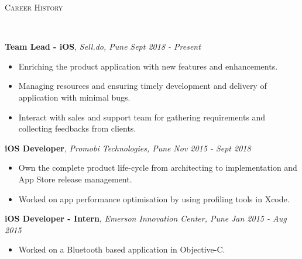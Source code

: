\documentclass[9pt]{article}
\newenvironment{changemargin}[2]{%
  \begin{list}{}{%
    \setlength{\topsep}{0pt}%
    \setlength{\leftmargin}{#1}%
    \setlength{\rightmargin}{#2}%
    \setlength{\listparindent}{\parindent}%
    \setlength{\itemindent}{\parindent}%
    \setlength{\parsep}{\parskip}%
  }%
  \item[]}{\end{list}
}
\newcommand{\lineover}{
    \begin{changemargin}{-0.05in}{-0.05in}
        \vspace*{-8pt}
        \hrulefill \\
        \vspace*{-2pt}
    \end{changemargin}
}
\newcommand{\header}[1]{
    \begin{changemargin}{-0.5in}{-0.5in}
        \scshape{#1}\\
    \lineover
    \end{changemargin}
}
\newenvironment{body} {
    \vspace*{-16pt}
    \begin{changemargin}{-0.25in}{-0.5in}
  }
    {\end{changemargin}
}
\begin{document}
\header{Career History}

\begin{body}
    \vspace{14pt}
    \textbf{Team Lead - iOS}, \emph{Sell.do, Pune} \hfill \emph{Sept 2018 - Present}\\
    \begin{itemize} \itemsep -0pt  %
        \item Enriching the product application with new features and enhancements.
    \end{itemize}
    \begin{itemize} \itemsep -0pt  %
        \item Managing resources and ensuring timely development and delivery of application with minimal bugs.
    \end{itemize}
    \begin{itemize} \itemsep -0pt  %
        \item Interact with sales and support team for gathering requirements and collecting feedbacks from clients.
    \end{itemize}
    \vspace*{-4pt}

    \vspace{14pt}
    \textbf{iOS Developer}, \emph{Promobi Technologies, Pune} \hfill \emph{Nov 2015 - Sept 2018}\\
    \begin{itemize} \itemsep -0pt  %
        \item Own the complete product life-cycle from architecting to implementation and App Store release management.
    \end{itemize}
    \begin{itemize} \itemsep -0pt  %
        \item Worked on app performance optimisation by using profiling tools in Xcode.
    \end{itemize}
    \vspace*{-4pt}

    \vspace{14pt}
    \textbf{iOS Developer - Intern}, \emph{Emerson Innovation Center, Pune} \hfill \emph{Jan 2015 - Aug 2015}\\
    \vspace*{-4pt}
    \begin{itemize} \itemsep -0pt  %
        \item Worked on a Bluetooth based application in Objective-C.
    \end{itemize}

\end{body}
\end{document}
